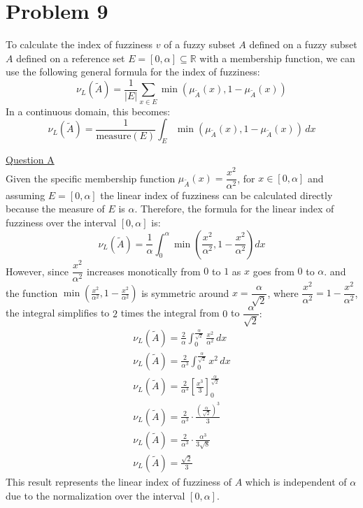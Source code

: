 \section{Problem 9}
To calculate the index of fuzziness $v$ of a fuzzy subset $A$ defined on a fuzzy subset $A$ defined on a reference set $E = [0, \alpha] \subseteq \mathbb{R}$ with a membership function, we can use the following general formula for the index of fuzziness:
\begin{equation}
	\nu_L(\tilde{A}) = \frac{1}{|E|} \sum_{x \in E} \min(\mu_{\tilde{A}}(x), 1 - \mu_{\tilde{A}}(x))
\end{equation}
In a continuous domain, this becomes:
\begin{equation}
	\nu_L(\tilde{A}) = \frac{1}{\text{measure}(E)} \int_{E} \min(\mu_{\tilde{A}}(x), 1 - \mu_{\tilde{A}}(x)) \, dx
\end{equation}

\underline{Question A}\\
Given the specific membership function $\mu_{\tilde{A}}(x) = \dfrac{x^2}{\alpha^2}$, for $x \in [0, \alpha]$ and assuming $E = [0, \alpha]$ the linear index of fuzziness can be calculated directly because the measure of $E$ is $α$. Therefore, the formula for the linear index of fuzziness over the interval 
$[0,α]$ is:
\begin{equation}
	\nu_L(\tilde{A}) = \dfrac{1}{\alpha} \int_{0}^{\alpha} \min\left( \dfrac{x^2}{\alpha^2}, 1 - \dfrac{x^2}{\alpha^2} \right) dx
\end{equation}
However, since $\dfrac{x^2}{\alpha^2}$ increases monotically from $0$ to $1$ as $x$ goes from $0$ to $\alpha$. and the function $\min\left(\frac{x^2}{\alpha^2}, 1 - \frac{x^2}{\alpha^2}\right)
$ is symmetric around $x = \dfrac{\alpha}{\sqrt{2}}$, where $\dfrac{x^2}{\alpha^2} = 1 - \dfrac{x^2}{\alpha^2}$, the integral simplifies to $2$ times the integral from $0$ to $\dfrac{\alpha}{\sqrt{2}}:$
\\
\begin{gather}
	\nu_L(\tilde{A}) = \frac{2}{\alpha} \int_{0}^{\frac{\alpha}{\sqrt{2}}} \frac{x^2}{\alpha^2} \, dx \\
	\nu_L(\tilde{A}) = \frac{2}{\alpha^3} \int_{0}^{\frac{\alpha}{\sqrt{2}}} x^2 \, dx\\
	\nu_L(\tilde{A}) = \frac{2}{\alpha^3} \left[ \frac{x^3}{3} \right]_{0}^{\frac{\alpha}{\sqrt{2}}} \\
	\nu_L(\tilde{A}) = \frac{2}{\alpha^3} \cdot \frac{\left(\frac{\alpha}{\sqrt{2}}\right)^3}{3}\\
	\nu_L(\tilde{A}) = \frac{2}{\alpha^3} \cdot \frac{\alpha^3}{3\sqrt{8}} \\
	\nu_L(\tilde{A}) = \frac{\sqrt{2}}{3}
\end{gather}
This result represents the linear index of fuzziness of $A$ which is independent of $\alpha$ due to the normalization over the interval $[0,\alpha]$.
\vspace{5mm}

